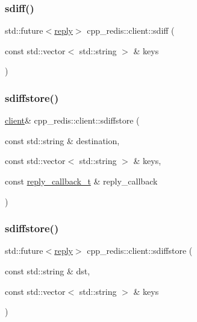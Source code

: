 \mbox{\label{classcpp__redis_1_1client_a93ff7c295d6147d3d452364533a19de9}} 
\subsubsection{\texorpdfstring{sdiff()}{sdiff()}\hspace{0.1cm}{\footnotesize\ttfamily [2/2]}}
{\footnotesize\ttfamily std\+::future$<$\hyperlink{classcpp__redis_1_1reply}{reply}$>$ cpp\+\_\+redis\+::client\+::sdiff (\begin{DoxyParamCaption}\item[{const std\+::vector$<$ std\+::string $>$ \&}]{keys }\end{DoxyParamCaption})}

\mbox{\label{classcpp__redis_1_1client_a0f896b36f3284d66bb1679f535378bf5}} 
\subsubsection{\texorpdfstring{sdiffstore()}{sdiffstore()}\hspace{0.1cm}{\footnotesize\ttfamily [1/2]}}
{\footnotesize\ttfamily \hyperlink{classcpp__redis_1_1client}{client}\& cpp\+\_\+redis\+::client\+::sdiffstore (\begin{DoxyParamCaption}\item[{const std\+::string \&}]{destination,  }\item[{const std\+::vector$<$ std\+::string $>$ \&}]{keys,  }\item[{const \hyperlink{classcpp__redis_1_1client_a061a1140d36d2eaeda82b09a0bb3f9f2}{reply\+\_\+callback\+\_\+t} \&}]{reply\+\_\+callback }\end{DoxyParamCaption})}

\mbox{\label{classcpp__redis_1_1client_afd4930fd767bbf14bae1f5ddfd8ee212}} 
\subsubsection{\texorpdfstring{sdiffstore()}{sdiffstore()}\hspace{0.1cm}{\footnotesize\ttfamily [2/2]}}
{\footnotesize\ttfamily std\+::future$<$\hyperlink{classcpp__redis_1_1reply}{reply}$>$ cpp\+\_\+redis\+::client\+::sdiffstore (\begin{DoxyParamCaption}\item[{const std\+::string \&}]{dst,  }\item[{const std\+::vector$<$ std\+::string $>$ \&}]{keys }\end{DoxyParamCaption})}

